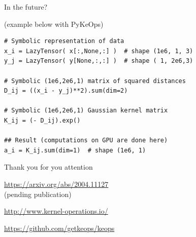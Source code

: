\documentclass[12pt,aspectratio=1610]{beamer}
\begin{document}
\begin{frame}[fragile]{In the future?}

 {\small (example below with PyKeOps)}

\begin{verbatim}
# Symbolic representation of data
x_i = LazyTensor( x[:,None,:] )  # shape (1e6, 1, 3)
y_j = LazyTensor( y[None,:,:] )  # shape ( 1, 2e6,3)

# Symbolic (1e6,2e6,1) matrix of squared distances
D_ij = ((x_i - y_j)**2).sum(dim=2)

# Symbolic (1e6,2e6,1) Gaussian kernel matrix
K_ij = (- D_ij).exp()

## Result (computations on GPU are done here)
a_i = K_ij.sum(dim=1)  # shape (1e6, 1)
\end{verbatim}

\end{frame}


\begin{frame}[standout]{}

Thank you for you attention\bigskip\bigskip\bigskip

{\small

\url{https://arxiv.org/abs/2004.11127}\\
(pending publication)\bigskip 

\url{http://www.kernel-operations.io/}\bigskip

\url{https://github.com/getkeops/keops}

}

\end{frame}
\end{document}

